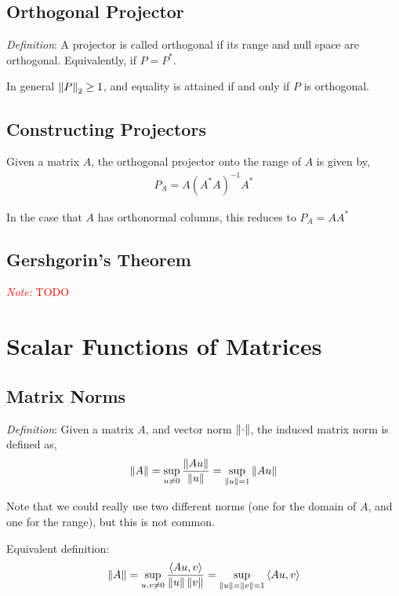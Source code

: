 \documentclass[12pt]{article}
\newcommand{\note}[1]{\textcolor{red}{\textit{Note:} #1}}
\begin{document}
\subsection{Orthogonal Projector}
\textit{Definition}: A projector is called orthogonal if its range and null space are orthogonal. Equivalently, if \( P = P^* \).

In general \( \left\lVert P\right\rVert_2 \geq 1 \), and equality is attained if and only if \( P \) is orthogonal.

\subsection{Constructing Projectors}
Given a matrix \( A \), the orthogonal projector onto the range of \( A \) is given by,
\begin{align*}
    P_A = A(A^*A)^{-1}A^*
\end{align*}

In the case that \( A \) has orthonormal columns, this reduces to \( P_A = AA^* \)


\subsection{Gershgorin's Theorem}

\note{TODO}

\pagebreak

\section{Scalar Functions of Matrices}

\subsection{Matrix Norms}
\textit{Definition}: Given a matrix \( A \), and vector norm \( \left\lVert\cdot\right\rVert \), the induced matrix norm is defined as,
\begin{align*}
    \left\lVert A\right\rVert = \sup_{u\neq 0} \frac{\left\lVert Au\right\rVert}{\left\lVert u\right\rVert} = \sup_{\left\lVert u\right\rVert=1} \left\lVert Au\right\rVert
\end{align*}

Note that we could really use two different norms (one for the domain of \( A \), and one for the range), but this is not common.

Equivalent definition:
\begin{align*}
    \left\lVert A\right\rVert = \sup_{u,v\neq 0} \frac{\left\langle Au,v \right\rangle}{\left\lVert u\right\rVert\left\lVert v\right\rVert} = \sup_{\left\lVert u\right\rVert=\left\lVert v\right\rVert=1} \left\langle Au,v \right\rangle
\end{align*}
 
\end{document}
